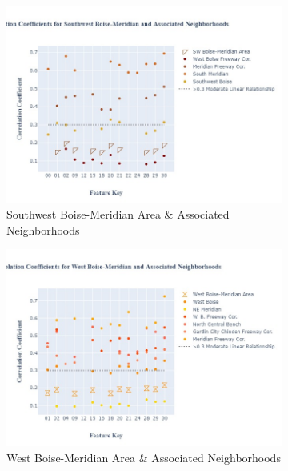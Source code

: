 \documentclass{article}
\begin{document}
\begin{figure}[H]
\begin{subfigure}[b]{0.45\textwidth}
         \includegraphics[width=\textwidth]{SWBM_fig.jpg}
         \caption{Southwest Boise-Meridian Area \& Associated Neighborhoods}
         \label{fig: swbm_ccg}
     \end{subfigure}
               \begin{subfigure}[b]{0.45\textwidth}
         \centering
         \includegraphics[width=\textwidth]{WBM_fig.jpg}
         \caption{West Boise-Meridian Area \& Associated Neighborhoods}
         \label{fig: wbm_ccg}
     \end{subfigure}
               \begin{subfigure}[b]{0.45\textwidth}
         \centering

\end{subfigure}
\end{figure}
\end{document}
